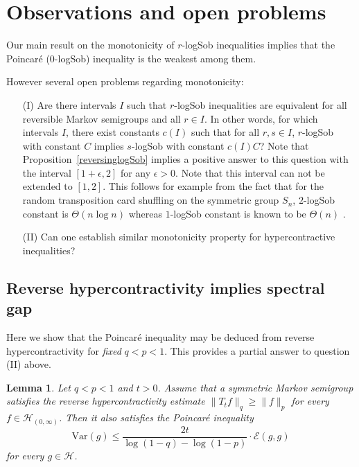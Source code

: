\documentclass[11pt]{amsart}
\newcommand{\Var}{\mathrm{Var}}
\newcommand{\eps}{\epsilon}
\newcommand{\1}{\mathbf{1}}
\def\e{{\mathcal{E}}}
\def\H{{\mathcal{H}}}
\theoremstyle{definition}
\theoremstyle{plain}
\newtheorem{lemma}[example]{Lemma}
\theoremstyle{remark}
\numberwithin{equation}{section}
\begin{document}
\section{Observations and open problems}

Our main result on the monotonicity of $r$-logSob inequalities implies that the Poincar\'e ($0$-logSob) inequality  is the weakest among them.

However several open problems regarding monotonicity:
\begin{enumerate}
\item[(I)]
Are there intervals $I$ such that $r$-logSob inequalities are equivalent for all reversible Markov semigroups and all $r \in I$. In other words, for which intervals
$I$, there exist constants $c(I)$ such that for all $r,s \in I$, 
$r$-logSob with constant $C$ implies $s$-logSob with constant $c(I) C$?  
Note that Proposition~\ref{reversinglogSob} implies a positive answer to this question with the interval $[1+\epsilon,2]$ for any $\eps>0$. Note that this interval can not be extended to $[1,2]$. This follows for example from the fact  that for the random transposition card shuffling on the symmetric group $S_n$,   $2$-logSob constant is $\Theta(n \log n)$ \cite{Lee98} whereas $1$-logSob constant is known to be $\Theta(n)$ \cite{Quastel03, Goel04}. 

\item[(II)]
Can one establish similar monotonicity property for hypercontractive inequalities?
\end{enumerate}


\subsection{Reverse hypercontractivity implies spectral gap}

Here we show that the Poincar\'e inequality may be deduced from reverse hypercontractivity for {\em fixed} $q<p<1$. This provides a partial answer to question (II) above.

\begin{lemma} \label{revhyp->poin}
Let $q<p<1$ and $t>0$. Assume that a symmetric Markov semigroup satisfies the reverse hypercontractivity
estimate $\| T_{t}f\|_{q} \geq \| f\|_{p}$ for every  $f \in \H_{(0,\infty)}$. Then it also satisfies the Poincar\'e inequality
\[
\Var(g) \leq \frac{2t}{\log(1-q)-\log(1-p)} \cdot \e(g,g)
\]
for every $g \in \H$.
\end{lemma}
\end{document}
